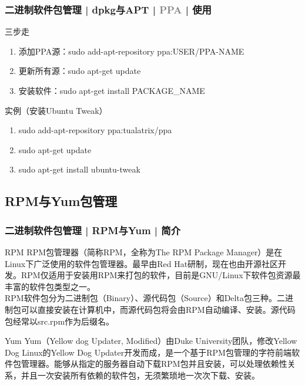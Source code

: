 \begin{frame}
  \frametitle{二进制软件包管理 | dpkg与APT | \textcolor{gray}{PPA} | 使用}
  \begin{block}{三步走}
    \begin{enumerate}
      \item 添加PPA源：sudo add-apt-repository ppa:USER/PPA-NAME
      \item 更新所有源：sudo apt-get update
      \item 安装软件：sudo apt-get install PACKAGE\_NAME
    \end{enumerate}
  \end{block}
  \pause
  \begin{block}{实例（安装Ubuntu Tweak）}
    \begin{enumerate}
      \item sudo add-apt-repository ppa:tualatrix/ppa
      \item sudo apt-get update
      \item sudo apt-get install ubuntu-tweak
    \end{enumerate}
  \end{block}
\end{frame}

\subsection{RPM与Yum包管理}
\begin{frame}
  \frametitle{二进制软件包管理 | RPM与Yum | 简介}
  \begin{block}{RPM}
    RPM包管理器（简称RPM，全称为The RPM Package Manager）是在Linux下广泛使用的软件包管理器。最早由Red Hat研制，现在也由开源社区开发。RPM仅适用于安装用RPM来打包的软件，目前是GNU/Linux下软件包资源最丰富的软件包类型之一。\\
    RPM软件包分为二进制包（Binary）、源代码包（Source）和Delta包三种。二进制包可以直接安装在计算机中，而源代码包将会由RPM自动编译、安装。源代码包经常以src.rpm作为后缀名。
  \end{block}
  \pause
  \begin{block}{Yum}
    Yum（Yellow dog Updater, Modified）由Duke University团队，修改Yellow Dog Linux的Yellow Dog Updater开发而成，是一个基于RPM包管理的字符前端软件包管理器。能够从指定的服务器自动下载RPM包并且安装，可以处理依赖性关系，并且一次安装所有依赖的软件包，无须繁琐地一次次下载、安装。
  \end{block}
\end{frame}

